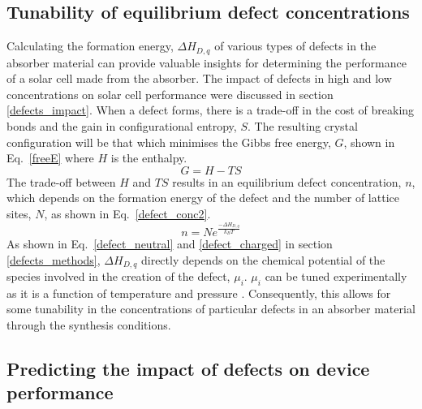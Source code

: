 \documentclass[11pt, twoside]{report}
\begin{document}
\subsection{Tunability of equilibrium defect concentrations}
Calculating the formation energy, $\Delta H_{D,q}$ of various types of defects in the absorber material can provide valuable insights for determining the performance of a solar cell made from the absorber. The impact of defects in high and low concentrations on solar cell performance were discussed in section \ref{defects_impact}. When a defect forms, there is a trade-off in the cost of breaking bonds and the gain in configurational entropy, $S$. The resulting crystal configuration will be that which minimises the Gibbs free energy, $G$, shown in Eq.~\ref{freeE} where $H$ is the enthalpy. 
\begin{equation}\label{freeE}
G = H - TS
\end{equation}
The trade-off between $H$ and $TS$ results in an equilibrium defect concentration, $n$, which depends on the formation energy of the defect and the number of lattice sites, $N$, as shown in Eq.~\ref{defect_conc2}.
\begin{equation}\label{defect_conc2}
n = N e^{\frac{-\Delta H_{D,q}}{k_B T}}
\end{equation}
As shown in Eq.~\ref{defect_neutral} and \ref{defect_charged} in section \ref{defects_methods}, $\Delta H_{D,q}$ directly depends on the chemical potential of the species involved in the creation of the defect, $\mu_i$. $\mu_i$ can be tuned experimentally as it is a function of temperature and pressure \cite{Adam_sulfur}. Consequently, this allows for some tunability in the concentrations of particular defects in an absorber material through the synthesis conditions.

\subsection{Predicting the impact of defects on device performance}
\end{document}
